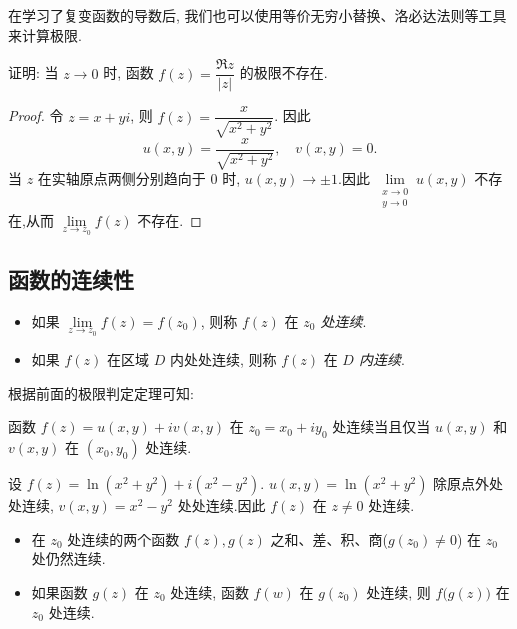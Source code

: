 在学习了复变函数的导数后, 我们也可以使用等价无穷小替换、洛必达法则等工具来计算极限.

\begin{example}
  证明: 当 $z\to0$ 时, 函数 $f(z)=\dfrac{\Re z}{|z|}$ 的极限不存在.
\end{example}

\begin{proof}
  令 $z=x+yi$, 则 $f(z)=\dfrac x{\sqrt{x^2+y^2}}$.
  因此
    \[u(x,y)=\frac x{\sqrt{x^2+y^2}},\quad v(x,y)=0.\]
  当 $z$ 在实轴原点两侧分别趋向于 $0$ 时, $u(x,y)\to\pm1$.因此 $\lim\limits_{\substack{x\to 0\\y\to0}}u(x,y)$ 不存在,从而 $\lim\limits_{z\to z_0}f(z)$ 不存在.
\end{proof}


\subsection{函数的连续性}

\begin{definition}
  \begin{itemize}
    \item 如果 $\lim\limits_{z\to z_0}f(z)=f(z_0)$, 则称 $f(z)$ 在 \emph{$z_0$ 处连续}.
    \item 如果 $f(z)$ 在区域 $D$ 内处处连续, 则称 $f(z)$ 在 \emph{$D$ 内连续}.
  \end{itemize}
\end{definition}

根据前面的极限判定定理可知:
\begin{theorem}
  函数 $f(z)=u(x,y)+iv(x,y)$ 在 $z_0=x_0+iy_0$ 处连续当且仅当 $u(x,y)$ 和 $v(x,y)$ 在 $(x_0,y_0)$ 处连续.
\end{theorem}

\begin{example}
  设 $f(z)=\ln(x^2+y^2)+i(x^2-y^2)$.
  $u(x,y)=\ln(x^2+y^2)$ 除原点外处处连续, $v(x,y)=x^2-y^2$ 处处连续.因此 $f(z)$ 在 $z\neq0$ 处连续.
\end{example}

\begin{theorem}
  \begin{itemize}
    \item 在 $z_0$ 处连续的两个函数 $f(z),g(z)$ 之和、差、积、商($g(z_0)\neq 0$) 在 $z_0$ 处仍然连续.
    \item 如果函数 $g(z)$ 在 $z_0$ 处连续, 函数 $f(w)$ 在 $g(z_0)$ 处连续, 则 $f\bigl(g(z)\bigr)$ 在 $z_0$ 处连续.
  \end{itemize}
\end{theorem}

